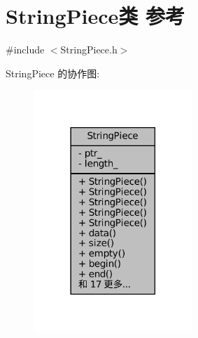 \hypertarget{classmuduo_1_1StringPiece}{}\section{String\+Piece类 参考}
\label{classmuduo_1_1StringPiece}


{\ttfamily \#include $<$String\+Piece.\+h$>$}



String\+Piece 的协作图\+:
\nopagebreak
\begin{figure}[H]
\begin{center}
\leavevmode
\includegraphics[width=170pt]{classmuduo_1_1StringPiece__coll__graph}
\end{center}
\end{figure}
